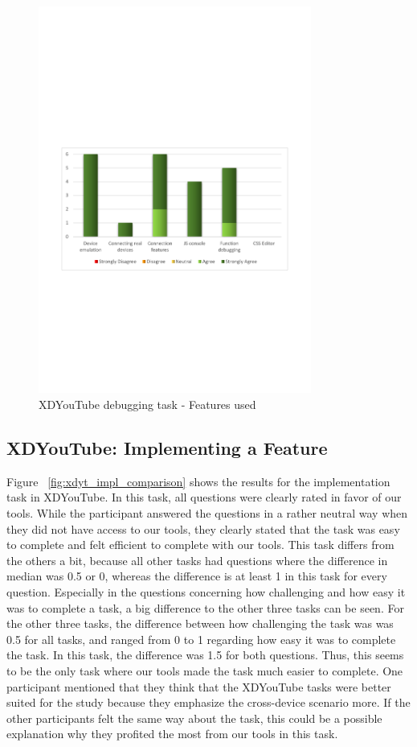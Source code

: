 \begin{figure}[H]
  \centering
    \includegraphics[width=0.8\textwidth]{images/charts/xdyt_bug_features_used.pdf}
	\caption{XDYouTube debugging task - Features used}
	\label{fig:xdyt_bug_features_used}
\end{figure}

\subsection{XDYouTube: Implementing a Feature}

Figure ~\ref{fig:xdyt_impl_comparison} shows the results for the implementation task in XDYouTube. In this task, all questions were clearly rated in favor of our tools. While the participant answered the questions in a rather neutral way when they did not have access to our tools, they clearly stated that the task was easy to complete and felt efficient to complete with our tools. This task differs from the others a bit, because all other tasks had questions where the difference in median was 0.5 or 0, whereas the difference is at least 1 in this task for every question. Especially in the questions concerning how challenging and how easy it was to complete a task, a big difference to the other three tasks can be seen. For the other three tasks, the difference between how challenging the task was was 0.5 for all tasks, and ranged from 0 to 1 regarding how easy it was to complete the task. In this task, the difference was 1.5 for both questions. Thus, this seems to be the only task where our tools made the task much easier to complete. One participant mentioned that they think that the XDYouTube tasks were better suited for the study because they emphasize the cross-device scenario more. If the other participants felt the same way about the task, this could be a possible explanation why they profited the most from our tools in this task.

